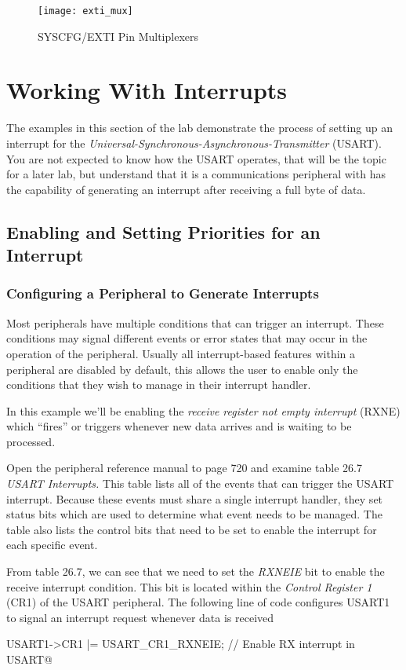 \documentclass[11pt,fleqn]{book} %
\makeatletter
\newcommand{\ilcode}[1]{
    \smallskip
    \colorbox{gray!20!white}{
        \centering
        \parbox{\linewidth-2\fboxsep}{
            \lstinline@#1@
        }
    }
}
\makeatother
\begin{document}
\begin{figure}[]
    \centering\texttt{[image: exti\_mux]}
    \caption{SYSCFG/EXTI Pin Multiplexers}
    \label{exti_mux}
\end{figure}

\section{Working With Interrupts}
The examples in this section of the lab demonstrate the process of setting up an interrupt for the \textit{Universal-Synchronous-Asynchronous-Transmitter} (USART). You are not expected to know how the USART operates, that will be the topic for a later lab, but understand that it is a communications peripheral with has the capability of generating an interrupt after receiving a full byte of data. 

\subsection{Enabling and Setting Priorities for an Interrupt}


\subsubsection{Configuring a Peripheral to Generate Interrupts} \label{periph_setup}
Most peripherals have multiple conditions that can trigger an interrupt. These conditions may signal different events or error states that may occur in the operation of the peripheral. Usually all interrupt-based features within a peripheral are disabled by default, this allows the user to enable only the conditions that they wish to manage in their interrupt handler. 

\begin{example}
     In this example we'll be enabling the \textit{receive register not empty interrupt} (RXNE) which ``fires'' or triggers whenever new data arrives and is waiting to be processed. 
    
    Open the peripheral reference manual to page 720 and examine table 26.7 \textit{USART Interrupts.} This table lists all of the events that can trigger the USART interrupt. Because these events must share a single interrupt handler, they set status bits which are used to determine what event needs to be managed. The table also lists the control bits that need to be set to enable the interrupt for each specific event.
    
    From table 26.7, we can see that we need to set the \textit{RXNEIE} bit to enable the receive interrupt condition. This bit is located within the \textit{Control Register 1} (CR1) of the USART peripheral. The following line of code configures USART1 to signal an interrupt request whenever data is received
    
    \ilcode{USART1->CR1 |= USART\_CR1\_RXNEIE;   // Enable RX interrupt in USART}
    \smallskip
\end{example}
\end{document}
